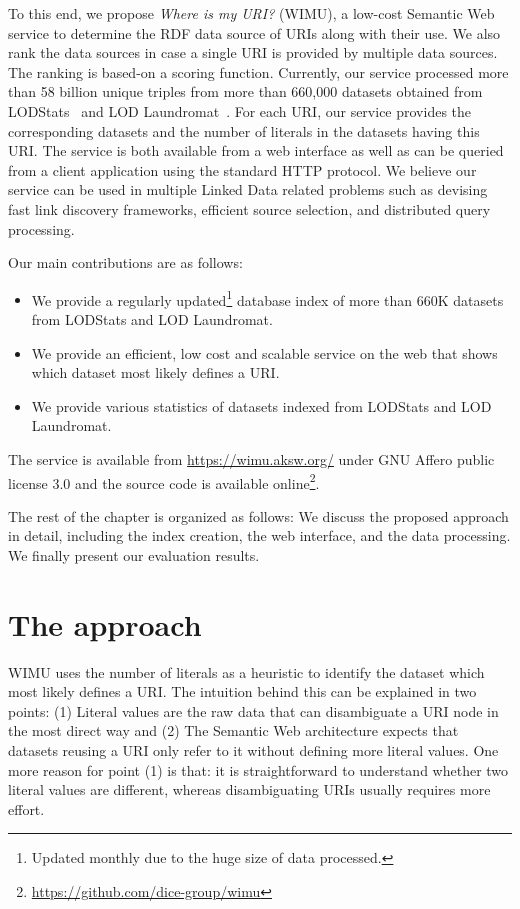 To this end, we propose \textit{Where is my URI?} (WIMU), a low-cost Semantic Web service to determine the RDF data source of URIs along with their use. 
We also rank the data sources in case a single URI is provided by multiple data sources. The ranking is based-on a scoring function. 
Currently, our service processed more than 58 billion unique triples from more than 660,000 datasets obtained from LODStats~\cite{auer2012lodstats} and LOD Laundromat~\cite{beek2014lod}. 
For each URI, our service provides the corresponding datasets and the number of literals in the datasets having this URI. 
The service is both available from a web interface as well as can be queried from a client application using the standard HTTP protocol. 
We believe our service can be used in multiple Linked Data related problems such as devising fast link discovery frameworks, efficient source selection, and distributed query processing.

Our main contributions are as follows:
\begin{itemize}
    \item We provide a regularly updated\footnote{Updated monthly due to the huge size of data processed.} database index of more than 660K datasets from LODStats and LOD Laundromat. 
    \item We provide an efficient, low cost and scalable service on the web that shows which dataset most likely defines a URI. 
    \item We provide various statistics of datasets indexed from LODStats and LOD Laundromat.
\end{itemize}
The service is available from \url{https://wimu.aksw.org/} under GNU Affero public license 3.0 and the source code is available online\footnote{\url{https://github.com/dice-group/wimu}}.

The rest of the chapter is organized as follows: 
We discuss the proposed approach in detail, including the index creation, the web interface, and the data processing. 
We finally present our evaluation results.

\section{The approach}

WIMU uses the number of literals as a heuristic to identify the dataset which most likely defines a URI.
The intuition behind this can be explained in two points: 
(1) Literal values are the raw data that can disambiguate a URI node in the most direct way and 
(2) The Semantic Web architecture expects that datasets reusing a URI only refer to it without defining more literal values. 
One more reason for point (1) is that: it is straightforward to understand whether two literal values are different, whereas disambiguating URIs usually requires more effort.

